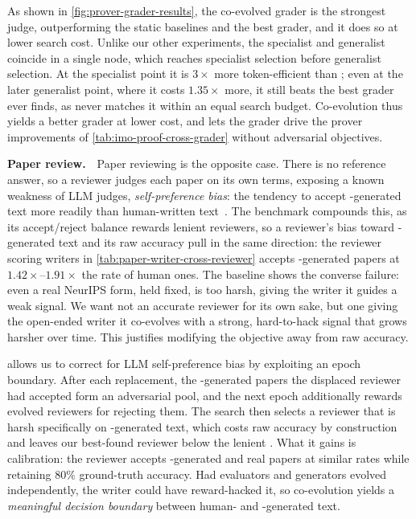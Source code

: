 As shown in \cref{fig:prover-grader-results}, the co-evolved grader is the strongest judge, outperforming the static baselines and the best \hgmh grader, and it does so at lower search cost. Unlike our other experiments, the specialist and generalist coincide in a single node, which reaches specialist selection before generalist selection. At the specialist point it is $3\times$ more token-efficient than \hgmh; even at the later generalist point, where it costs $1.35\times$ more, it still beats the best grader \hgmh ever finds, as \hgmh never matches it within an equal search budget. Co-evolution thus yields a better grader at lower cost, and lets the grader drive the prover improvements of \cref{tab:imo-proof-cross-grader} without adversarial objectives.





\noindent\textbf{Paper review.}~~Paper reviewing is the opposite case. There is no reference answer, so a reviewer judges each paper on its own terms, exposing a known weakness of LLM judges, \emph{self-preference bias}: the tendency to accept \AI-generated text more readily than human-written text~\citep{DBLP:conf/nips/PanicksseryBF24,jiang2025badscientist}. The \apres benchmark compounds this, as its accept/reject balance rewards lenient reviewers, so a reviewer's bias toward \AI-generated text and its raw \apres accuracy pull in the same direction: the \hgmh reviewer scoring writers in \cref{tab:paper-writer-cross-reviewer} accepts \AI-generated papers at $1.42\times$--$1.91\times$ the rate of human ones. The \sakana baseline shows the converse failure: even a real NeurIPS form, held fixed, is too harsh, giving the \hgmh writer it guides a weak signal. We want not an accurate reviewer for its own sake, but one giving the open-ended writer it co-evolves with a strong, hard-to-hack signal that grows harsher over time. This justifies modifying the objective away from raw \apres accuracy.



\Theourmethod allows us to correct for LLM self-preference bias by exploiting an epoch boundary. After each replacement, the \AI-generated papers the displaced reviewer had accepted form an adversarial pool, and the next epoch additionally rewards evolved reviewers for rejecting them. The search then selects a reviewer that is harsh specifically on \AI-generated text, which costs raw accuracy by construction and leaves our best-found reviewer below the lenient \hgmh. What it gains is calibration: the reviewer accepts \AI-generated and real papers at similar rates while retaining $80\%$ ground-truth accuracy. Had evaluators and generators evolved independently, the writer could have reward-hacked it, so co-evolution yields a \emph{meaningful decision boundary} between human- and \AI-generated text.


